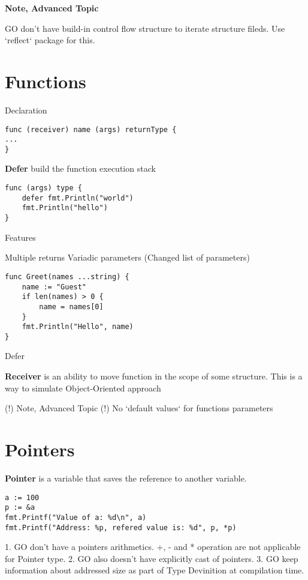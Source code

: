\documentclass[12pt]{article}
\begin{document}
\textbf{Note, Advanced Topic}

GO don't have build-in control flow structure to iterate structure fileds.
Use `reflect` package for this.

\newpage
\section{Functions}

Declaration
\begin{lstlisting}
func (receiver) name (args) returnType {
...
}
\end{lstlisting}

\textbf{Defer} build the function execution stack
\begin{lstlisting}
func (args) type {
    defer fmt.Println("world")
    fmt.Println("hello")
}
\end{lstlisting}

Features

Multiple returns
Variadic parameters (Changed list of parameters)
\begin{lstlisting}
func Greet(names ...string) {
    name := "Guest"
    if len(names) > 0 {
        name = names[0]
    }
    fmt.Println("Hello", name)
}
\end{lstlisting}
Defer

\textbf{Receiver} is an ability to move function in the scope of some structure.
This is a way to simulate Object-Oriented approach

(!) Note, Advanced Topic (!)
No `default values` for functions parameters


\newpage
\section{Pointers}
\textbf{Pointer} is a variable that saves the reference to another variable.

\begin{paracol}{2} \begin{leftcolumn}
\begin{lstlisting}
a := 100
p := &a
fmt.Printf("Value of a: %d\n", a)
fmt.Printf("Address: %p, refered value is: %d", p, *p)
\end{lstlisting}
\end{leftcolumn} \begin{rightcolumn}
1. GO don't have a pointers arithmetics. +, - and * operation are not applicable
for Pointer type.
2. GO also doesn't have explicitly cast of pointers.
3. GO keep information about addressed size as part of Type Devinition at
compilation time.

\end{rightcolumn}
\end{paracol}
\end{document}
